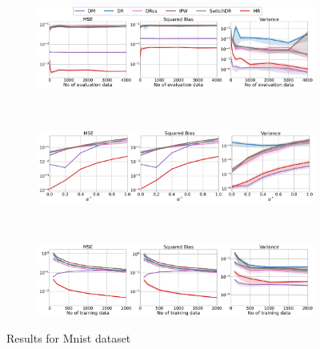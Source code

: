 \begin{figure}[h!]
    \centering
	\begin{subfigure}{0.8\textwidth}
	    \centering
	    \includegraphics[width=1\textwidth]{figures/mr/multiclass/ope_vs_n_alphatar_0_2_mnist_ntr1000.png}
	    \label{subfig:mnist-neval}
	\end{subfigure}\\
	\begin{subfigure}{0.8\textwidth} 
	    \centering
	    \includegraphics[width=1\textwidth]{figures/mr/multiclass/ope_vs_alphatar_neval_1000_mnist_ntr_1000.png}
	    \label{subfig:mnist-ae}
	\end{subfigure}\\
 	\begin{subfigure}{0.8\textwidth} 
	    \centering
	    \includegraphics[width=1\textwidth]{figures/mr/multiclass/ope_vs_ntr_neval_1000_mnist_alpha_0_6.png}
	    \label{subfig:mnist-tr}
	\end{subfigure}
    \caption{Results for Mnist dataset}
    \label{fig:mnist}
\end{figure}

